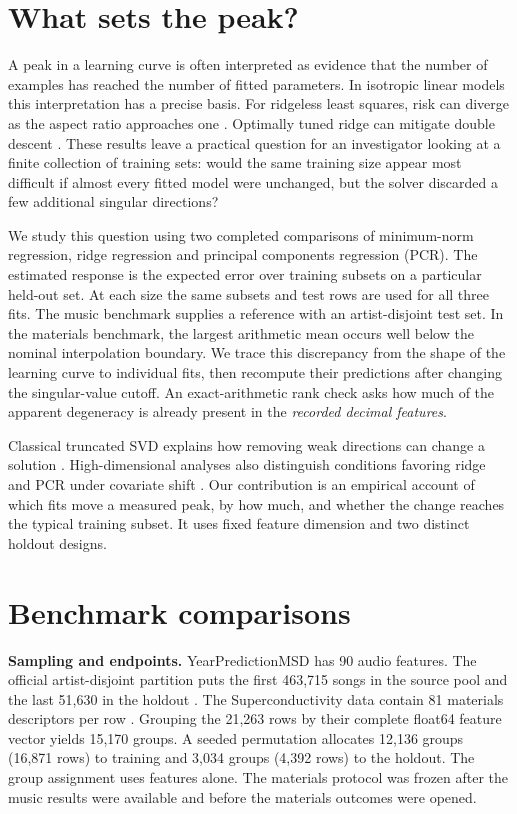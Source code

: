 \section{What sets the peak?}
A peak in a learning curve is often interpreted as evidence that the number of examples has reached the number of fitted parameters. In isotropic linear models this interpretation has a precise basis. For ridgeless least squares, risk can diverge as the aspect ratio approaches one \cite{hastie}. Optimally tuned ridge can mitigate double descent \cite{nakkiran}. These results leave a practical question for an investigator looking at a finite collection of training sets: would the same training size appear most difficult if almost every fitted model were unchanged, but the solver discarded a few additional singular directions?

We study this question using two completed comparisons of minimum-norm regression, ridge regression and principal components regression (PCR). The estimated response is the expected error over training subsets on a particular held-out set. At each size the same subsets and test rows are used for all three fits. The music benchmark supplies a reference with an artist-disjoint test set. In the materials benchmark, the largest arithmetic mean occurs well below the nominal interpolation boundary. We trace this discrepancy from the shape of the learning curve to individual fits, then recompute their predictions after changing the singular-value cutoff. An exact-arithmetic rank check asks how much of the apparent degeneracy is already present in the \emph{recorded decimal features}.

Classical truncated SVD explains how removing weak directions can change a solution \cite{hansen}. High-dimensional analyses also distinguish conditions favoring ridge and PCR under covariate shift \cite{tang}. Our contribution is an empirical account of which fits move a measured peak, by how much, and whether the change reaches the typical training subset. It uses fixed feature dimension and two distinct holdout designs.

\section{Benchmark comparisons}
\textbf{Sampling and endpoints.} YearPredictionMSD has 90 audio features. The official artist-disjoint partition puts the first 463,715 songs in the source pool and the last 51,630 in the holdout \cite{year}. The Superconductivity data contain 81 materials descriptors per row \cite{super}. Grouping the 21,263 rows by their complete float64 feature vector yields 15,170 groups. A seeded permutation allocates 12,136 groups (16,871 rows) to training and 3,034 groups (4,392 rows) to the holdout. The group assignment uses features alone. The materials protocol was frozen after the music results were available and before the materials outcomes were opened.


